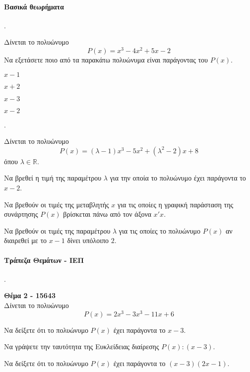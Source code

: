 \documentclass[11pt,a4paper,twocolumn]{article}
\newcounter{askhsh}
\newcommand{\askhsh}{\large\theaskhsh.\ \addtocounter{askhsh}{1}}
\begin{document}
\paragraph{Βασικά θεωρήματα}
\askhsh Δίνεται το πολυώνυμο
\[ P(x)=x^3-4x^2+5x-2 \]
Να εξετάσετε ποιο από τα παρακάτω πολυώνυμα είναι παράγοντας του $P(x)$.
\begin{multicols}{4}
\begin{alist}
\item $x-1$
\item $x+2$
\item $x-3$
\item $x-2$
\end{alist}
\end{multicols}
\askhsh Δίνεται το πολυώνυμο \[ P(x)=(\lambda-1)x^3-5x^2+(\lambda^2-2)x+8 \] όπου $ \lambda\in\mathbb{R} $.
\begin{alist}
\item Να βρεθεί η τιμή της παραμέτρου $ \lambda $ για την οποία το πολυώνυμο έχει παράγοντα το $ x-2 $.
\item Να βρεθούν οι τιμές της μεταβλητής $ x $ για τις οποίες η γραφική παράσταση της συνάρτησης $ P(x) $ βρίσκεται πάνω από τον άξονα $ x'x $.
\item Να βρεθούν οι τιμές της παραμέτρου $ \lambda $ για τις οποίες το πολυώνυμο $ P(x) $ αν διαιρεθεί με το $ x-1 $ δίνει υπόλοιπο $ 2 $.
\end{alist}
\paragraph{Τράπεζα Θεμάτων - ΙΕΠ}
\askhsh \textbf{Θέμα 2 - 15643}\\
Δίνεται το πολυώνυμο
\[ P(x)=2x^3-3x^3-11x+6 \]
\begin{alist}
\item \begin{rlist}
\item Να δείξετε ότι το πολυώνυμο $P(x)$ έχει παράγοντα το $x-3$.
\item Να γράψετε την ταυτότητα της Ευκλείδειας διαίρεσης $P(x):(x-3)$.
\end{rlist}
\item Να δείξετε ότι το πολυώνυμο $P(x)$ έχει παράγοντα το $(x-3)(2x-1)$.
\end{alist}
\end{document}
